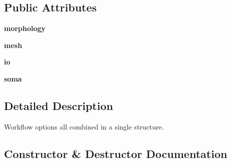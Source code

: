 \subsection*{Public Attributes}
\begin{DoxyCompactItemize}
\item 
{\bfseries morphology}\hypertarget{classmeshy_1_1neuromorphovis_1_1options_1_1neuromorphovis__options_1_1NeuroMorphoVisOptions_a81a3bd461bc1b867329ec4f3ac3ec58f}{}\label{classmeshy_1_1neuromorphovis_1_1options_1_1neuromorphovis__options_1_1NeuroMorphoVisOptions_a81a3bd461bc1b867329ec4f3ac3ec58f}

\item 
{\bfseries mesh}\hypertarget{classmeshy_1_1neuromorphovis_1_1options_1_1neuromorphovis__options_1_1NeuroMorphoVisOptions_ab26b76243b6381349a94eb08adf13d51}{}\label{classmeshy_1_1neuromorphovis_1_1options_1_1neuromorphovis__options_1_1NeuroMorphoVisOptions_ab26b76243b6381349a94eb08adf13d51}

\item 
{\bfseries io}\hypertarget{classmeshy_1_1neuromorphovis_1_1options_1_1neuromorphovis__options_1_1NeuroMorphoVisOptions_a7865fd0d4fe6a5a0c4a237a17115b739}{}\label{classmeshy_1_1neuromorphovis_1_1options_1_1neuromorphovis__options_1_1NeuroMorphoVisOptions_a7865fd0d4fe6a5a0c4a237a17115b739}

\item 
{\bfseries soma}\hypertarget{classmeshy_1_1neuromorphovis_1_1options_1_1neuromorphovis__options_1_1NeuroMorphoVisOptions_a873cc725edbcf7ef3774ab6548a8afae}{}\label{classmeshy_1_1neuromorphovis_1_1options_1_1neuromorphovis__options_1_1NeuroMorphoVisOptions_a873cc725edbcf7ef3774ab6548a8afae}

\end{DoxyCompactItemize}


\subsection{Detailed Description}


\begin{DoxyVerb}Workflow options all combined in a single structure.
\end{DoxyVerb}
 

\subsection{Constructor \& Destructor Documentation}
